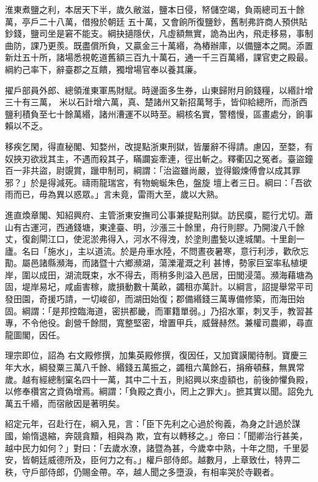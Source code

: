 \begin{pinyinscope}
 淮東煮鹽之利，本居天下半，歲久敝滋，鹽本日侵，帑儲空竭，負兩總司五十餘萬，亭戶二十八萬，借撥於朝廷
 五十萬，又會餉所復鹽鈔，舊制弗許商人預供貼鈔錢，鹽司坐是窘不能支。綱抉擿隱伏，凡虛額無實，詭為出內，飛走移易，事制曲防，課乃更羨。既盡償所負，又贏金三十萬緡，為樁辦庫，以備鹽本之闕。添置新灶五十所，諸場悉視乾道舊額三百九十萬石，通一千三百萬緡，課官吏之殿最。綱約己率下，辭臺郡之互饋，獨增場官奉以養其廉。



 擢戶部員外郎、總領淮東軍馬財賦。時邊面多生券，山東歸附月餉錢糧，以緡計增三十有三萬，
 米以石計增六萬，真、楚諸州又新招萬弩手，皆仰給總所，而浙西鹽利積負至七十餘萬緡，諸州漕運不以時至。綱核名實，警稽慢，區畫處分，餉事賴以不乏。



 移疾乞閑，得直秘閣、知婺州，改提點浙東刑獄，皆屢辭不得請。慮囚，至婺，有奴挾刃欲戕其主，不遇而殺其子，瞞讕妄牽連，徑出斬之。釋衢囚之冤者。臺盜鐘百一非共盜，尉覬賞，躐申制司，綱謂：「治盜雖尚嚴，豈得鍛煉傅會以成其罪邪？」於是得減死。禱雨龍瑞宮，有物蜿蜒朱色，盤旋
 壇上者三日。綱曰：「吾欲雨而已，毋為異以惑眾。」言未竟，雷雨大至，歲以大熟。



 進直煥章閣、知紹興府、主管浙東安撫司公事兼提點刑獄。訪民瘼，罷行尤切。蕭山有古運河，西通錢塘，東達臺、明，沙漲三十餘里，舟行則膠。乃開浚八千餘丈，復創閘江口，使泥淤弗得入，河水不得洩，於塗則盡甃以達城闉。十里創一廬。名曰「施水」，主以道流。於是舟車水陸，不問晝夜暑寒，意行利涉，歡欣忘勩。屬邑諸縣瀕海，而諸暨十六鄉瀕湖，蕩濼灌溉之利
 甚博，勢家巨室率私植埂岸，圍以成田，湖流既束，水不得去，雨稍多則溢入邑居，田閭浸蕩。瀕海藉塘為固，堤岸易圮，咸鹵害稼，歲損動數十萬畝，蠲租亦萬計。以綱言，詔提舉常平司發田園，奇援巧請，一切峻卻，而湖田始復；郡備緡錢三萬專備修築，而海田始固。綱謂：「是邦控臨海道，密拱都畿，而軍籍單弱。」乃招水軍，刺叉手，教習甚專，不令他役。創營千餘間，寬整堅密，增置甲兵，威聲赫然。兼權司農卿，尋直龍圖閣，因任。



 理宗即位，詔為
 右文殿修撰，加集英殿修撰，復因任，又加寶謨閣待制。寶慶三年大水，綱發粟三萬八千餘、緡錢五萬振之，蠲租六萬餘石，捐瘠頓蘇，無異常歲。越有經總制窠名四十一萬，其中二十五，則紹興以來虛額也，前後帥懼負殿，以修奉欑宮之資偽增焉。綱謂：「負殿之責小，罔上之罪大」。摭其實以聞。詔免九萬五千緡，而宿敝因是著明矣。



 紹定元年，召赴行在，綱入見，言：「臣下先利之心過於徇義，為身之計過於謀國，媮惰退縮，奔競貪黷，相與為
 欺，宜有以轉移之。」帝曰：「聞卿治行甚美，越中民力如何？」對曰：「去歲水潦，諸暨為甚，今歲幸中熟，十年之間，千里晏安，皆朝廷威德所及，臣何力之有。」權戶部侍郎。越數月，上章致仕，特畀二秩，守戶部侍郎，仍賜金帶。卒，越人聞之多墮淚，有相率哭於寺觀者。




\end{pinyinscope}
